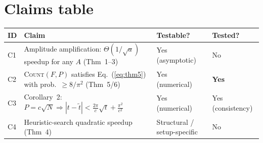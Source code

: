 \documentclass[11pt]{article}
\begin{document}
\section{Claims table}
\begin{center}
\begin{tabular}{@{}llll@{}}
\toprule
\textbf{ID} & \textbf{Claim} & \textbf{Testable?} & \textbf{Tested?}\\
\midrule
C1 & Amplitude amplification: $\Theta(1/\sqrt{a})$ speedup for any $A$ (Thm~1--3) & Yes (asymptotic) & No\\
C2 & \textsc{Count}$(F,P)$ satisfies Eq.~(\ref{eq:thm5}) with prob.\ $\ge 8/\pi^2$ (Thm~5/6) & Yes (numerical) & \textbf{Yes}\\
C3 & Corollary~2: $P=c\sqrt N \Rightarrow |t-\tilde t| < \tfrac{2\pi}{c}\sqrt t + \tfrac{\pi^2}{c^2}$ & Yes (numerical) & Yes (consistency)\\
C4 & Heuristic-search quadratic speedup (Thm~4) & Structural / setup-specific & No\\
\bottomrule
\end{tabular}
\end{center}
\end{document}
